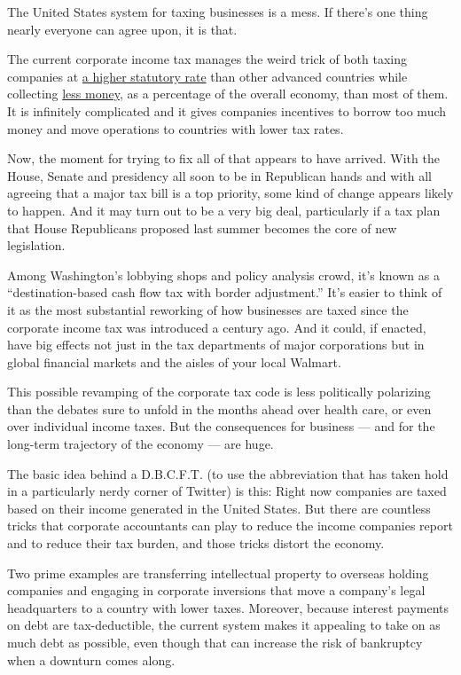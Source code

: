The United States system for taxing businesses is a mess. If there's one
thing nearly everyone can agree upon, it is that.

The current corporate income tax manages the weird trick of both taxing
companies at
\href{http://taxfoundation.org/article/corporate-income-tax-rates-around-world-2016}{a
higher statutory rate} than other advanced countries while collecting
\href{http://fivethirtyeight.com/datalab/u-s-tax-rates-the-big-picture/}{less
money}, as a percentage of the overall economy, than most of them. It is
infinitely complicated and it gives companies incentives to borrow too
much money and move operations to countries with lower tax rates.

Now, the moment for trying to fix all of that appears to have arrived.
With the House, Senate and presidency all soon to be in Republican hands
and with all agreeing that a major tax bill is a top priority, some kind
of change appears likely to happen. And it may turn out to be a very big
deal, particularly if a tax plan that House Republicans proposed last
summer becomes the core of new legislation.

Among Washington's lobbying shops and policy analysis crowd, it's known
as a ``destination-based cash flow tax with border adjustment.'' It's
easier to think of it as the most substantial reworking of how
businesses are taxed since the corporate income tax was introduced a
century ago. And it could, if enacted, have big effects not just in the
tax departments of major corporations but in global financial markets
and the aisles of your local Walmart.

This possible revamping of the corporate tax code is less politically
polarizing than the debates sure to unfold in the months ahead over
health care, or even over individual income taxes. But the consequences
for business --- and for the long-term trajectory of the economy --- are
huge.

The basic idea behind a D.B.C.F.T. (to use the abbreviation that has
taken hold in a particularly nerdy corner of Twitter) is this: Right now
companies are taxed based on their income generated in the United
States. But there are countless tricks that corporate accountants can
play to reduce the income companies report and to reduce their tax
burden, and those tricks distort the economy.

Two prime examples are transferring intellectual property to overseas
holding companies and engaging in corporate inversions that move a
company's legal headquarters to a country with lower taxes. Moreover,
because interest payments on debt are tax-deductible, the current system
makes it appealing to take on as much debt as possible, even though that
can increase the risk of bankruptcy when a downturn comes along.

